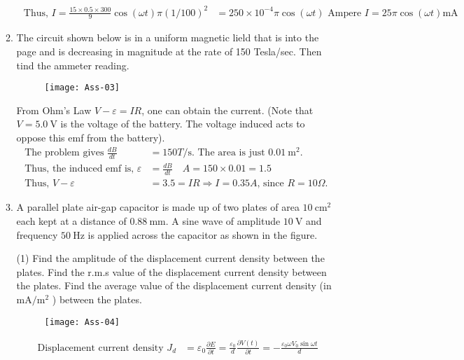 \begin{enumerate}
\begin{enumerate}
\begin{answer}
\begin{align*}
	\text { Thus, } I=\frac{15 \times 0.5 \times 300}{9} \cos (\omega t) \pi(1 / 100)^{2}&=250 \times 10^{-4} \pi \cos (\omega t) \text { Ampere }I=25 \pi \cos (\omega t) \mathrm{mA}
	\end{align*}
\end{answer}
	\item The circuit shown below is in a uniform magnetic lield that is into the page and is decreasing in magnitude at the rate of 150 Tesla/sec. Then tind the ammeter reading.
	\begin{figure}[H]
		\centering
		\texttt{[image: Ass-03]}
	\end{figure}
\begin{answer}
 From Ohm's Law $V-\varepsilon=I R$, one can obtain the current. (Note that $V=5.0 \mathrm{~V}$ is the voltage of the battery. The voltage induced acts to oppose this emf from the battery).
	\begin{align*}
	\text { The problem gives } \frac{d B}{d t}&=150 T / \mathrm{s} \text {. The area is just } 0.01 \mathrm{~m}^{2} \text {. }\\
	\text { Thus, the induced emf is, } \varepsilon&=\frac{d B}{d t} \quad A=150 \times 0.01=1.5\\
	\text { Thus, } V-\varepsilon&=3.5=I R \Rightarrow I=0.35 A \text {, since } R=10 \Omega \text {. }
	\end{align*}
\end{answer}
	\item A parallel plate air-gap capacitor is made up of two plates of area $10 \mathrm{~cm}^{2}$ each kept at a distance of $0.88 \mathrm{~mm}$. A sine wave of amplitude $10 \mathrm{~V}$ and frequency $50 \mathrm{~Hz}$ is applied across the capacitor as shown in the figure.
	\begin{tasks}(1)
		\task[\textbf{a.}]Find the amplitude of the displacement current density between the plates.
		\task[\textbf{b.}]
		 Find the r.m.s value of the displacement current density between the plates.
		\task[\textbf{c.}]Find the average value of the displacement current density (in $\mathrm{mA} / \mathrm{m}^{2}$ ) between the plates.
	\end{tasks}
	\begin{figure}[H]
		\centering
		\texttt{[image: Ass-04]}
	\end{figure}
\begin{answer}
	\begin{align*}
	\text { Displacement current density } J_{d}&=\varepsilon_{0} \frac{\partial E}{\partial t}=\frac{\varepsilon_{0}}{d} \frac{\partial V(t)}{\partial t}=-\frac{\varepsilon_{0} \omega V_{0} \sin \omega t}{d}\\

\end{align*}
\end{answer}
\end{enumerate}
\end{enumerate}

